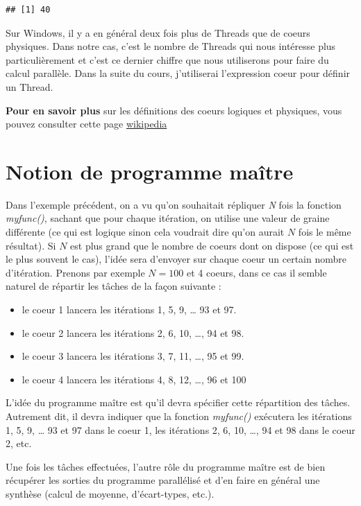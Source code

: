 \documentclass[
]{book}
\providecommand{\tightlist}{%
  \setlength{\itemsep}{0pt}\setlength{\parskip}{0pt}}
\theoremstyle{definition}
\theoremstyle{definition}
\theoremstyle{definition}
\theoremstyle{definition}
\theoremstyle{remark}
\begin{document}
\begin{verbatim}
## [1] 40
\end{verbatim}

Sur Windows, il y a en général deux fois plus de Threads que de coeurs physiques. Dans notre cas, c'est le nombre de Threads qui nous intéresse plus particulièrement et c'est ce dernier chiffre que nous utiliserons pour faire du calcul parallèle. Dans la suite du cours, j'utiliserai l'expression coeur pour définir un Thread.

\textbf{Pour en savoir plus} sur les définitions des coeurs logiques et physiques, vous pouvez consulter cette page \href{https://fr.wikipedia.org/wiki/Hyper-Threading}{wikipedia}

\hypertarget{notion-de-programme-mauxeetre}{%
\section{Notion de programme maître}\label{notion-de-programme-mauxeetre}}

Dans l'exemple précédent, on a vu qu'on souhaitait répliquer \emph{N} fois la fonction \emph{myfunc()}, sachant que pour chaque itération, on utilise une valeur de graine différente (ce qui est logique sinon cela voudrait dire qu'on aurait \(N\) fois le même résultat). Si \(N\) est plus grand que le nombre de coeurs dont on dispose (ce qui est le plus souvent le cas), l'idée sera d'envoyer sur chaque coeur un certain nombre d'itération. Prenons par exemple \(N=100\) et 4 coeurs, dans ce cas il semble naturel de répartir les tâches de la façon suivante :

\begin{itemize}
\tightlist
\item
  le coeur 1 lancera les itérations 1, 5, 9, \ldots{} 93 et 97.
\item
  le coeur 2 lancera les itérations 2, 6, 10, \ldots, 94 et 98.
\item
  le coeur 3 lancera les itérations 3, 7, 11, \ldots, 95 et 99.
\item
  le coeur 4 lancera les itérations 4, 8, 12, \ldots, 96 et 100
\end{itemize}

L'idée du programme maître est qu'il devra spécifier cette répartition des tâches. Autrement dit, il devra indiquer que la fonction \emph{myfunc()} exécutera les itérations 1, 5, 9, \ldots{} 93 et 97 dans le coeur 1, les itérations 2, 6, 10, \ldots, 94 et 98 dans le coeur 2, etc.

Une fois les tâches effectuées, l'autre rôle du programme maître est de bien récupérer les sorties du programme parallélisé et d'en faire en général une synthèse (calcul de moyenne, d'écart-types, etc.).
\end{document}
